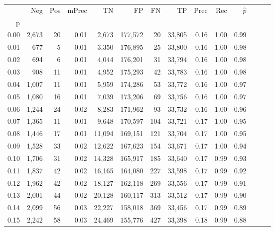 \begin{tabular}{rrrrrrrrrrrrrr}
\toprule
{} &    Neg &  Pos & mPrec &       TN &       FP &      FN &      TP &  Prec &   Rec & $\hat{p}$ \\
p    &        &      &       &          &          &         &         &       &       &           \\
\midrule
0.00 &  2,673 &   20 &  0.01 &    2,673 &  177,572 &      20 &  33,805 &  0.16 &  1.00 &      0.99 \\
0.01 &    677 &    5 &  0.01 &    3,350 &  176,895 &      25 &  33,800 &  0.16 &  1.00 &      0.98 \\
0.02 &    694 &    6 &  0.01 &    4,044 &  176,201 &      31 &  33,794 &  0.16 &  1.00 &      0.98 \\
0.03 &    908 &   11 &  0.01 &    4,952 &  175,293 &      42 &  33,783 &  0.16 &  1.00 &      0.98 \\
0.04 &  1,007 &   11 &  0.01 &    5,959 &  174,286 &      53 &  33,772 &  0.16 &  1.00 &      0.97 \\
0.05 &  1,080 &   16 &  0.01 &    7,039 &  173,206 &      69 &  33,756 &  0.16 &  1.00 &      0.97 \\
0.06 &  1,244 &   24 &  0.02 &    8,283 &  171,962 &      93 &  33,732 &  0.16 &  1.00 &      0.96 \\
0.07 &  1,365 &   11 &  0.01 &    9,648 &  170,597 &     104 &  33,721 &  0.17 &  1.00 &      0.95 \\
0.08 &  1,446 &   17 &  0.01 &   11,094 &  169,151 &     121 &  33,704 &  0.17 &  1.00 &      0.95 \\
0.09 &  1,528 &   33 &  0.02 &   12,622 &  167,623 &     154 &  33,671 &  0.17 &  1.00 &      0.94 \\
0.10 &  1,706 &   31 &  0.02 &   14,328 &  165,917 &     185 &  33,640 &  0.17 &  0.99 &      0.93 \\
0.11 &  1,837 &   42 &  0.02 &   16,165 &  164,080 &     227 &  33,598 &  0.17 &  0.99 &      0.92 \\
0.12 &  1,962 &   42 &  0.02 &   18,127 &  162,118 &     269 &  33,556 &  0.17 &  0.99 &      0.91 \\
0.13 &  2,001 &   44 &  0.02 &   20,128 &  160,117 &     313 &  33,512 &  0.17 &  0.99 &      0.90 \\
0.14 &  2,099 &   56 &  0.03 &   22,227 &  158,018 &     369 &  33,456 &  0.17 &  0.99 &      0.89 \\
0.15 &  2,242 &   58 &  0.03 &   24,469 &  155,776 &     427 &  33,398 &  0.18 &  0.99 &      0.88 \\

\end{tabular}
